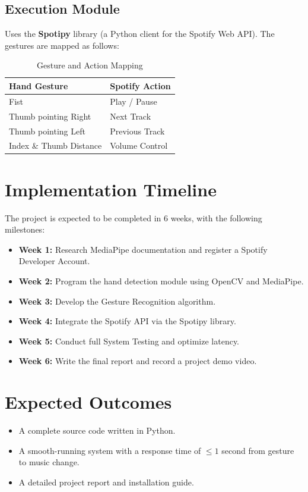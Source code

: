 \documentclass[12pt,a4paper]{article}
\begin{document}
\subsection{Execution Module}
Uses the \textbf{Spotipy} library (a Python client for the Spotify Web API). The gestures are mapped as follows:
\begin{table}[h]
\centering
\begin{tabular}{@{}ll@{}}
\toprule
\textbf{Hand Gesture}         & \textbf{Spotify Action} \\ \midrule
Fist                          & Play / Pause            \\
Thumb pointing Right          & Next Track              \\
Thumb pointing Left           & Previous Track          \\
Index \& Thumb Distance       & Volume Control          \\ \bottomrule
\end{tabular}
\caption{Gesture and Action Mapping}
\end{table}

\section{Implementation Timeline}
The project is expected to be completed in 6 weeks, with the following milestones:

\begin{itemize}
    \item \textbf{Week 1:} Research MediaPipe documentation and register a Spotify Developer Account.
    \item \textbf{Week 2:} Program the hand detection module using OpenCV and MediaPipe.
    \item \textbf{Week 3:} Develop the Gesture Recognition algorithm.
    \item \textbf{Week 4:} Integrate the Spotify API via the Spotipy library.
    \item \textbf{Week 5:} Conduct full System Testing and optimize latency.
    \item \textbf{Week 6:} Write the final report and record a project demo video.
\end{itemize}

\section{Expected Outcomes}
\begin{itemize}
    \item A complete source code written in Python.
    \item A smooth-running system with a response time of $\le 1$ second from gesture to music change.
    \item A detailed project report and installation guide.
\end{itemize}
\end{document}
